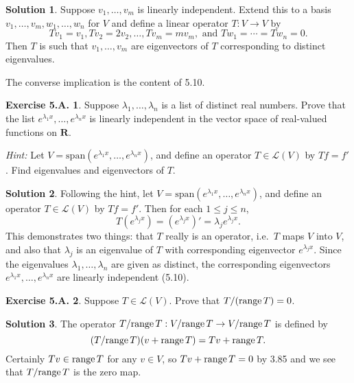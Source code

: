 \documentclass[12pt]{article}
\theoremstyle{definition}
\theoremstyle{exercise}
\newtheorem{exercise}{Exercise 5.A.}
\theoremstyle{solution}
\newtheorem*{solution}{Solution}
\newcommand{\lmap}{\mathcal{L}}
\newcommand{\Span}{\text{span}}
\newcommand{\Range}{\text{range\,}}
\newcommand{\R}{\mathbf{R}}
\begin{document}
\begin{solution}
    Suppose \( v_1, \ldots, v_m \) is linearly independent. Extend this to a basis \( v_1, \ldots, v_m, w_1, \ldots, w_n \) for \( V \) and define a linear operator \( T : V \to V \) by
    \[
        Tv_1 = v_1, Tv_2 = 2 v_2, \ldots, Tv_m = m v_m, \text{ and } Tw_1 = \cdots = Tw_n = 0.
    \]
    Then \( T \) is such that \( v_1, \ldots, v_m \) are eigenvectors of \( T \) corresponding to distinct eigenvalues.

    The converse implication is the content of 5.10.
\end{solution}

\begin{exercise}
\label{ex:32}
    Suppose \( \lambda_1, \ldots, \lambda_n \) is a list of distinct real numbers. Prove that the list \( e^{\lambda_1 x}, \ldots, e^{\lambda_n x} \) is linearly independent in the vector space of real-valued functions on \( \R \).

    \vspace{2mm}

    \noindent \textit{Hint:} Let \( V = \Span(e^{\lambda_1 x}, \ldots, e^{\lambda_n x}) \), and define an operator \( T \in \lmap(V) \) by \( Tf = f' \). Find eigenvalues and eigenvectors of \( T \).
\end{exercise}

\begin{solution}
    Following the hint, let \( V = \Span(e^{\lambda_1 x}, \ldots, e^{\lambda_n x}) \), and define an operator \( T \in \lmap(V) \) by \( Tf = f' \). Then for each \( 1 \leq j \leq n \),
    \[
        T \left( e^{\lambda_j x} \right) = \left( e^{\lambda_j x} \right)' = \lambda_j e^{\lambda_j x}.
    \]
    This demonstrates two things: that \( T \) really is an operator, i.e.\ \( T \) maps \( V \) into \( V \), and also that \( \lambda_j \) is an eigenvalue of \( T \) with corresponding eigenvector \( e^{\lambda_j x} \). Since the eigenvalues \( \lambda_1, \ldots, \lambda_n \) are given as distinct, the corresponding eigenvectors \( e^{\lambda_1 x}, \ldots, e^{\lambda_n x} \) are linearly independent (5.10).
\end{solution}

\begin{exercise}
\label{ex:33}
    Suppose \( T \in \lmap(V) \). Prove that \( T/(\Range T) = 0 \).
\end{exercise}

\begin{solution}
    The operator \( T/\Range T : V/\Range T \to V/\Range T \) is defined by
    \[
        (T/\Range T)(v + \Range T) = Tv + \Range T.
    \]
    Certainly \( Tv \in \Range T \) for any \( v \in V \), so \( Tv + \Range T = 0 \) by 3.85 and we see that \( T/\Range T \) is the zero map.
\end{solution}
\end{document}
